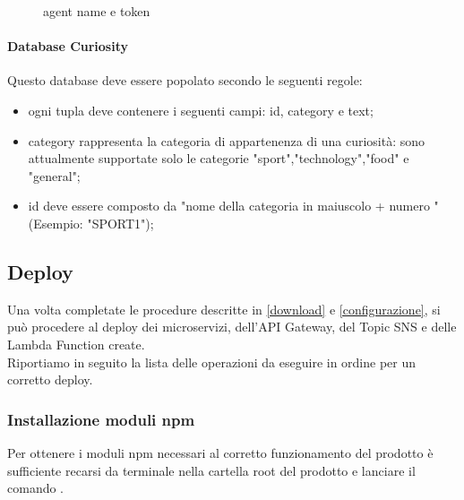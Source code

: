 \begin{figure}[h]
	\caption{agent name e token}\label{fig:Agent-Token}
\end{figure}

\paragraph{Database Curiosity}
Questo database deve essere popolato secondo le seguenti regole:
\begin{itemize}
\item ogni tupla deve contenere i seguenti campi: id, category e text;
\item category rappresenta la categoria di appartenenza di una curiosità: sono attualmente supportate solo le categorie "sport","technology","food" e "general";
\item id deve essere composto da "nome della categoria in maiuscolo + numero "(Esempio: "SPORT1");
\end{itemize}



\subsection{Deploy}
Una volta completate le procedure descritte in \ref{download} e \ref{configurazione}, si può procedere al deploy dei microservizi, dell'API Gateway, del Topic SNS e delle Lambda Function create.\\Riportiamo in seguito la lista delle operazioni da eseguire in ordine per un corretto deploy.  

\subsubsection{Installazione moduli npm}
Per ottenere i moduli npm necessari al corretto funzionamento del prodotto è sufficiente recarsi da terminale nella cartella root del prodotto e lanciare il comando .

